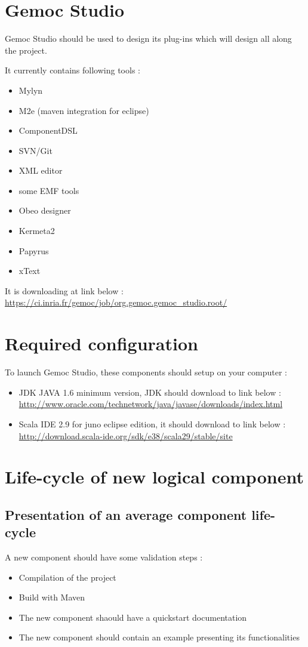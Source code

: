 \documentclass{gemoc} %
\begin{document}
\section{Gemoc Studio}
Gemoc Studio should be used to design its plug-ins which will design all along the project.

It currently contains following tools :
\begin{itemize}
	\item Mylyn
	\item M2e (maven integration for eclipse)
	\item ComponentDSL
	\item SVN/Git
	\item XML editor
	\item some EMF tools
	\item Obeo designer
	\item Kermeta2
	\item Papyrus
	\item xText
\end{itemize}
It is downloading at link below :
\newline
\url {https://ci.inria.fr/gemoc/job/org.gemoc.gemoc_studio.root/}
\section{Required configuration}
To launch Gemoc Studio, these components should setup on your computer :
\begin{itemize}
	\item JDK JAVA 1.6 minimum version, JDK should download to link below :
	\newline
	\url {http://www.oracle.com/technetwork/java/javase/downloads/index.html}
	\item Scala IDE 2.9 for juno eclipse edition, it should download to link below :
	\newline
	\url {http://download.scala-ide.org/sdk/e38/scala29/stable/site}
\end{itemize}
\section{Life-cycle of new logical component}
\subsection{Presentation of an average component life-cycle}
A new component should have some validation steps :
\begin{itemize}
	\item Compilation of the project
	\item Build with Maven
	\item The new component shaould have a quickstart documentation
	\item The new component should contain an example presenting its functionalities
\end{itemize}
\end{document}
